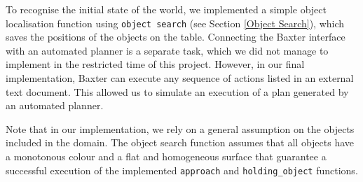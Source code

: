 To recognise the initial state of the world, we implemented a simple object localisation function using \texttt{object search} (see Section \ref{Object Search}), which saves the positions of the objects on the table.
Connecting the Baxter interface with an automated planner is a separate task, which we did not manage to implement in the restricted time of this project.
However, in our final implementation, Baxter can execute any sequence of actions listed in an external text document.
This allowed us to simulate an execution of a plan generated by an automated planner.

Note that in our implementation, we rely on a general assumption on the objects included in the domain.
The object search function assumes that all objects have a monotonous colour and a flat and homogeneous surface that guarantee a successful execution of the implemented \texttt{approach} and \texttt{holding\_object} functions.



%

